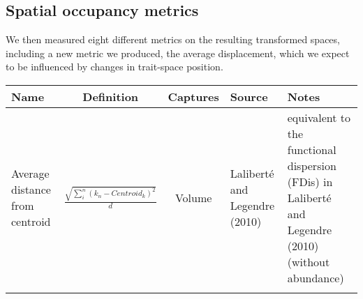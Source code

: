 \documentclass[]{article}
\begin{document}
\subsection{Spatial occupancy metrics}\label{spatial-occupancy-metrics}

We then measured eight different metrics on the resulting transformed
spaces, including a new metric we produced, the average displacement,
which we expect to be influenced by changes in trait-space position.

\renewcommand\baselinestretch{1}\selectfont

\begin{longtable}[]{@{}lccll@{}}
\toprule
\begin{minipage}[b]{0.1\columnwidth}\raggedright\strut
Name\strut
\end{minipage} & \begin{minipage}[b]{0.25\columnwidth}\raggedright\strut
Definition\strut
\end{minipage} & \begin{minipage}[b]{0.09\columnwidth}\raggedright\strut
Captures\strut
\end{minipage} & \begin{minipage}[b]{0.1\columnwidth}\raggedright\strut
Source\strut
\end{minipage} & \begin{minipage}[b]{0.4\columnwidth}\raggedright\strut
Notes\strut
\end{minipage}\tabularnewline
\midrule
\endhead
\begin{minipage}[t]{0.1\columnwidth}\raggedright\strut
Average distance from centroid\strut
\end{minipage} & \begin{minipage}[t]{0.25\columnwidth}\raggedright\strut
\(\frac{\sqrt{\sum_{i}^{n}{({k}_{n}-Centroid_{k})^2}}}{d}\)\strut
\end{minipage} & \begin{minipage}[t]{0.09\columnwidth}\raggedright\strut
Volume\strut
\end{minipage} & \begin{minipage}[t]{0.1\columnwidth}\raggedright\strut
Laliberté and Legendre (2010)\strut
\end{minipage} & \begin{minipage}[t]{0.4\columnwidth}\raggedright\strut
equivalent to the functional dispersion (FDis) in Laliberté and Legendre
(2010) (without abundance)\strut
\end{minipage}\tabularnewline
\begin{minipage}[t]{0.1\columnwidth}\raggedright\strut

\end{minipage}
\end{longtable}
\end{document}
